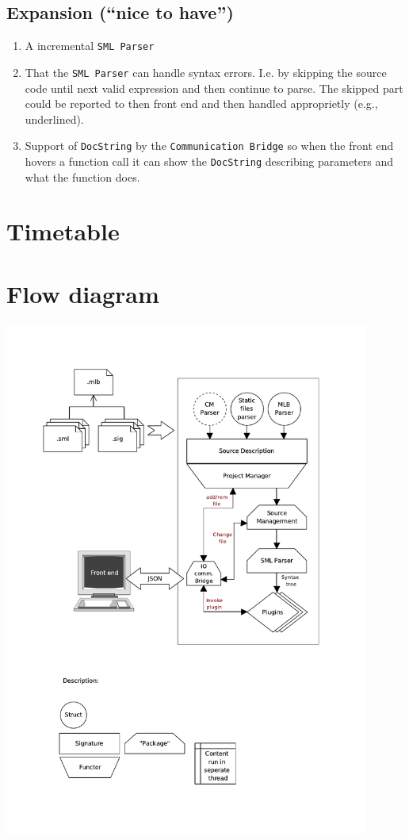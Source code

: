\documentclass[a4paper,oneside]{memoir}
\begin{document}
\section{Expansion (``nice to have'')}


\begin{enumerate}
\item A incremental \texttt{SML Parser}

\item That the \texttt{SML Parser} can handle syntax errors. I.e. by skipping
  the source code until next valid expression and then continue to parse. The
  skipped part could be reported to then front end and then handled approprietly
  (e.g., underlined).

\item Support of \texttt{DocString} by the \texttt{Communication Bridge} so when
  the front end hovers a function call it can show the \texttt{DocString}
  describing parameters and what the function does.
\end{enumerate}


\appendix

\chapter{Timetable}


\chapter{Flow diagram}
\includegraphics[width=0.9\textwidth]{../drawings/flow}



%
%
\end{document}
